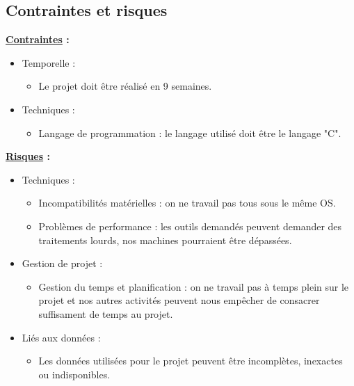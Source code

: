 \documentclass[a4paper, 12pt]{report}
\begin{document}
        \subsection{Contraintes et risques}

\textbf{\underline{Contraintes} :}
\begin{itemize}
    \item Temporelle :
    \begin{itemize}
        \item Le projet doit être réalisé en 9 semaines.
    \end{itemize}
    \item Techniques :
    \begin{itemize}
        \item Langage de programmation : le langage utilisé doit être le langage "C".
    \end{itemize}
\end{itemize}
\bigskip

\textbf{\underline{Risques} :}
\begin{itemize}
    \item Techniques :
    \begin{itemize}
        \item Incompatibilités matérielles : on ne travail pas tous sous le même OS.
        \item Problèmes de performance : les outils demandés peuvent demander des traitements lourds, nos machines pourraient être dépassées.
    \end{itemize}
    \item Gestion de projet : 
    \begin{itemize}
        \item Gestion du temps et planification : on ne travail pas à temps plein sur le projet et nos autres activités peuvent nous empêcher de consacrer suffisament de temps au projet.
    \end{itemize}
    \item Liés aux données :
    \begin{itemize}
        \item Les données utilisées pour le projet peuvent être incomplètes, inexactes ou indisponibles.
    \end{itemize}
\end{itemize}
\bigskip
\end{document}
